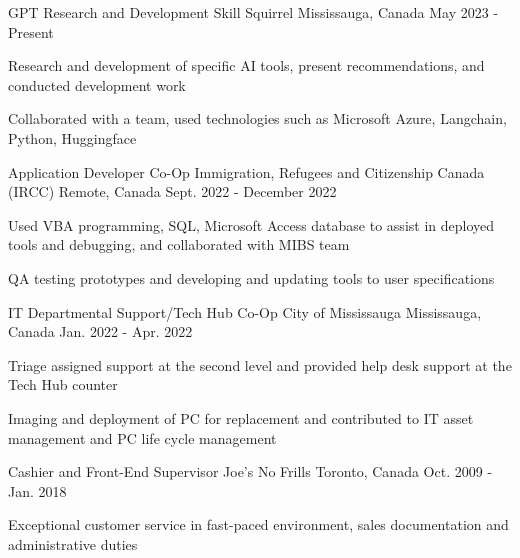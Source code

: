 \begin{cventries}
 \cventry
    {GPT Research and Development}
    {Skill Squirrel}
    {Mississauga, Canada}
    {May 2023 - Present}
    {
      \begin{cvitems}
        \item {Research and development of specific AI tools, present recommendations, and conducted development work}
        \item {Collaborated with a team, used technologies such as Microsoft Azure, Langchain, Python, Huggingface}
      \end{cvitems}
    }
  \cventry
    {Application Developer Co-Op}
    {Immigration, Refugees and Citizenship Canada (IRCC)}
    {Remote, Canada}
    {Sept. 2022 - December 2022}
    {
      \begin{cvitems}
        \item {Used VBA programming, SQL, Microsoft Access database to assist in deployed tools and debugging, and collaborated with MIBS team}
        \item {QA testing prototypes and developing and updating tools to user specifications}
      \end{cvitems}
    }
      \cventry
    {IT Departmental Support/Tech Hub Co-Op}
    {City of Mississauga}
    {Mississauga, Canada}
    {Jan. 2022 - Apr. 2022}
    {
      \begin{cvitems}
        \item {Triage assigned support at the second level and provided help desk support at the Tech Hub counter}
        \item {Imaging and deployment of PC for replacement and contributed to IT asset management and PC life cycle management }
      \end{cvitems}
    }
       \cventry
    {Cashier and Front-End Supervisor}
    {Joe's No Frills}
    {Toronto, Canada}
    {Oct. 2009 - Jan. 2018}
    {
      \begin{cvitems}
        \item {Exceptional customer service in fast-paced environment, sales documentation and administrative duties}
      \end{cvitems}
    }
\end{cventries}